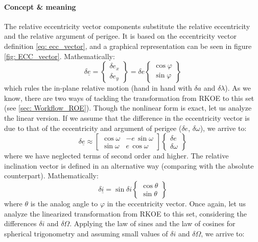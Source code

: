 	\paragraph{Concept \& meaning\\}
	\indent The relative eccentricity vector components substitute the relative eccentricity and the relative argument of perigee. It is based on the eccentricity vector definition \eqref{eq: 	ecc_vector}, and a graphical representation can be seen in figure \ref{fig: 	ECC_vector}. Mathematically:
	\[
	\delta \underline{e} = 
	\left\{ 
	\begin{array}{c}
	\delta e_x \\[1.5em]
	\delta e_y
	\end{array}
	\right\} = \delta e
	\left\{ 
	\begin{array}{c}
	\cos\varphi \\[1.5em]
	\sin\varphi
	\end{array}
	\right\}
	\]
	\noindent which rules the in-plane relative motion (hand in hand with $\delta a$ and $\delta \lambda$). As we know, there are two ways of tackling the transformation from RKOE to this set (see \ref{sec: Workflow_ROE}). Though the nonlinear form is exact, let us analyze the linear version. If we assume that the difference in the eccentricity vector is due to that of the eccentricity and argument of perigee ($\delta e$, $\delta \omega$), we arrive to:
	\begin{equation}
	\delta \underline{e} \approx 
	\left[ 
	\begin{array}{cc}
	\cos\omega  & -e\, \sin\omega\\[1.5em]
	\sin\omega  & e\, \cos\omega
	\end{array}
	\right]
	\left\{ 
	\begin{array}{c}
	\delta e \\[1.5em]
	\delta \omega
	\end{array}
	\right\}
	\label{eq: 	e_vec_mat}
	\end{equation}
	\noindent where we have neglected terms of second order and higher. The relative inclination vector is defined in an alternative way \cite{DAmico_Montenbruck} (comparing with the absolute counterpart). Mathematically:
	\[
	\delta \underline{i} = \sin \delta i
	\left\{ 
	\begin{array}{c}
	\cos\theta \\[1.5em]
	\sin\theta
	\end{array}
	\right\}
	\]
	\noindent where $\theta$ is the analog angle to $\varphi$ in the eccentricity vector. Once again, let us analyze the linearized transformation from RKOE to this set, considering the differences $\delta i$ and $\delta \Omega$. Applying the law of sines and the law of cosines for spherical trigonometry and assuming small values of $\delta i$ and $\delta \Omega$, we arrive to:
